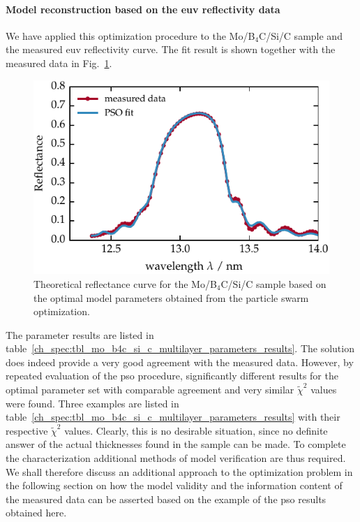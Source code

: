 \paragraph{Model reconstruction based on the \gls{euv} reflectivity data}
We have applied this optimization procedure to the Mo/B$_4$C/Si/C sample and the measured \gls{euv} reflectivity curve. The fit result is shown together with the measured data in Fig.~\ref{ch_spec:fig_ptb17_reflectance_AOI_15_fitted}.
\begin{figure}[htbp]
\centering
\includegraphics{img/PTB17_reflectance_AOI_15_fitted}
\caption[Theoretical reflectance curve for the Mo/B$_4$C/Si/C sample based on the optimal model parameters]{Theoretical reflectance curve for the Mo/B$_4$C/Si/C sample based on the optimal model parameters obtained from the particle swarm optimization.}
\label{ch_spec:fig_ptb17_reflectance_AOI_15_fitted}
\end{figure}
The parameter results are listed in table~\ref{ch_spec:tbl_mo_b4c_si_c_multilayer_parameters_results}. The solution does indeed provide a very good agreement with the measured data. However, by repeated evaluation of the \gls{pso} procedure, significantly different results for the optimal parameter set with comparable agreement and very similar $\tilde{\chi}^2$ values were found. Three examples are listed in table~\ref{ch_spec:tbl_mo_b4c_si_c_multilayer_parameters_results} with their respective $\tilde{\chi}^2$ values. Clearly, this is no desirable situation, since no definite answer of the actual thicknesses found in the sample can be made. To complete the characterization additional methods of model verification are thus required. We shall therefore discuss an additional approach to the optimization problem in the following section on how the model validity and the information content of the measured data can be asserted based on the example of the \gls{pso} results obtained here.
